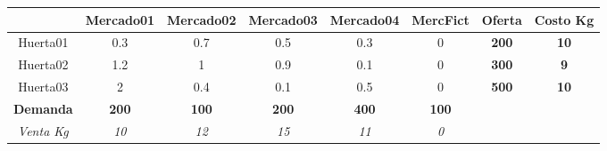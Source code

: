     \begin{tabular}{cccccccc}
            & Mercado01 & Mercado02 & Mercado03 & Mercado04 & MercFict & \textbf{Oferta} & \textcolor[rgb]{ 1,  0,  0}{\textbf{Costo Kg}} \bigstrut[b]\\
    \hline
    \hline
    Huerta01 & 0.3     & 0.7     & 0.5     & 0.3     & 0       & \textbf{200} & \textcolor[rgb]{ 1,  0,  0}{\textbf{10}} \bigstrut[t]\\
    Huerta02 & 1.2     & 1       & 0.9     & 0.1     & 0       & \textbf{300} & \textcolor[rgb]{ 1,  0,  0}{\textbf{9}} \\
    Huerta03 & 2       & 0.4     & 0.1     & 0.5     & 0       & \textbf{500} & \textcolor[rgb]{ 1,  0,  0}{\textbf{10}} \bigstrut[b]\\
    \hline
    \hline
    \textbf{Demanda} & \textbf{200} & \textbf{100} & \textbf{200} & \textbf{400} & \textbf{100} &         &  \bigstrut[t]\\
    \textcolor[rgb]{ .439,  .678,  .278}{\textit{Venta Kg}} & \textcolor[rgb]{ .439,  .678,  .278}{\textit{10}} & \textcolor[rgb]{ .439,  .678,  .278}{\textit{12}} & \textcolor[rgb]{ .439,  .678,  .278}{\textit{15}} & \textcolor[rgb]{ .439,  .678,  .278}{\textit{11}} & \textcolor[rgb]{ .439,  .678,  .278}{\textit{0}} &         &  \\
    \end{tabular}%
